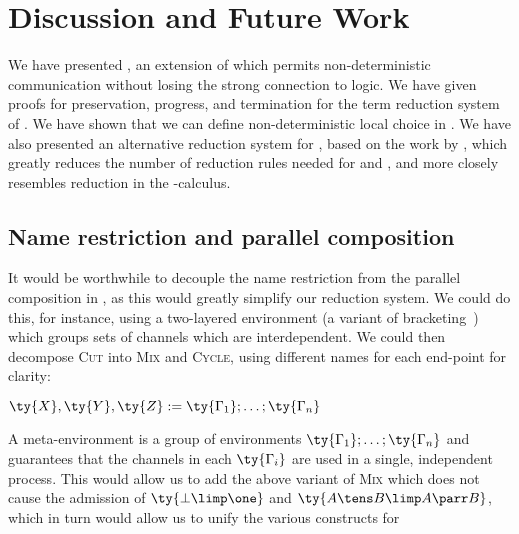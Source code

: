 \documentclass[UKenglish]{llncs}
\begin{document}
\section{Discussion and Future Work}\label{sec:discussion}
We have presented \nodcap, an extension of \cp which permits non-deterministic
communication without losing the strong connection to logic.
We have given proofs for preservation, progress, and termination for the term
reduction system of \nodcap.
We have shown that we can define non-deterministic local choice in \nodcap.
We have also presented an alternative reduction system for \cp, based on the
work by \textcite{lindley2015semantics}, which greatly reduces the number of
reduction rules needed for \cp and \nodcap, and more closely resembles reduction
in the \textpi-calculus.

\subsection{Name restriction and parallel composition}
It would be worthwhile to decouple the name restriction from the parallel
composition in \cp, as this would greatly simplify our reduction system.
We could do this, for instance, using a two-layered environment (a variant of
bracketing~\parencite{moortgat1996}) which groups sets of channels which are
interdependent. We could then decompose \textsc{Cut} into \textsc{Mix} and
\textsc{Cycle}, using different names for each end-point for clarity:
\begin{center}
  \(\ty{X}, \ty{Y}, \ty{Z} := \ty{\Gamma_1} ; \dots ; \ty{\Gamma_n}\)
  \\[1\baselineskip]
  \begin{prooftree*}
  \end{prooftree*}
  \begin{prooftree*}
  \end{prooftree*}
\end{center}
A meta-environment  is a group of environments \(\ty{\Gamma_1} ; \dots ;
\ty{\Gamma_n}\) and guarantees that the channels in each \(\ty{\Gamma_i}\) are
used in a single, independent process.
This would allow us to add the above variant of \textsc{Mix} which does not
cause the admission of \(\ty{\bot\limp\one}\) and \(\ty{A \tens B \limp A \parr
  B}\), which in turn would allow us to unify the various constructs for
\end{document}
